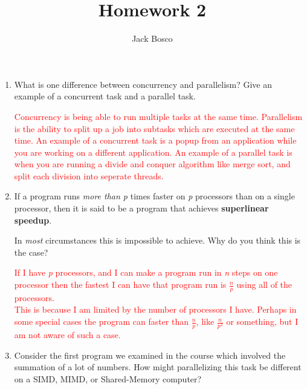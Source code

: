 \documentclass[a4paper]{article}
\author{Jack Bosco}
\title{Homework 2}
\begin{document}
\maketitle

\begin{enumerate}
	\item 
		What is one difference between concurrency and parallelism? 
		Give an example of a concurrent task and a parallel task.

		\textcolor{red}{
			Concurrency is being able to run multiple tasks at the same time.
			Parallelism is the ability to split up a job into subtasks which are executed at the same time.
			An example of a concurrent task is a popup from an application while you are working on a different application.
			An example of a parallel task is when you are running a divide and conquer algorithm like merge sort, and split each division into seperate threads.}
	\item 
		If a program runs \textit{more than p} times faster on \textit{p} processors than on a single processor, then it is said to be a program that achieves \textbf{superlinear speedup}.
		
		In \textit{most} circumstances this is impossible to achieve. Why do you think this is the case?
		
		\textcolor{red}{
			If I have \textit{p} processors, and I can make a program run in \textit{n} steps on one processor
			then the fastest I can have that program run is $\frac{n}{p}$ using all of the processors.\\
			This is because I am limited by the number of processors I have.
			Perhaps in some special cases the program can faster than $\frac{n}{p}$,
			like $\frac{n}{p^2}$ or something, but I am not aware of such a case.
		}
	\item 
		Consider the ﬁrst program we examined in the course which involved the summation of a lot of numbers.
		How might parallelizing this task be different on a SIMD, MIMD, or Shared-Memory computer?


\end{enumerate}
\end{document}
